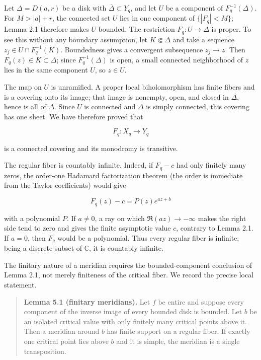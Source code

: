 Let \(\Delta=D(a,r)\) be a disk with \(\overline\Delta\subset Y_q\), and
let \(U\) be a component of \(F_q^{-1}(\Delta)\). For
\(M>|a|+r\), the connected set \(U\) lies in one component of
\(\{|F_q|<M\}\); Lemma 2.1 therefore makes \(U\) bounded. The restriction
\(F_q:U\to\Delta\) is proper. To see this without any boundary
assumption, let \(K\Subset\Delta\) and take a sequence
\(z_j\in U\cap F_q^{-1}(K)\). Boundedness gives a convergent subsequence
\(z_j\to z\). Then \(F_q(z)\in K\subset\Delta\); since
\(F_q^{-1}(\Delta)\) is open, a small connected neighborhood of \(z\) lies
in the same component \(U\), so \(z\in U\).

The map on \(U\) is unramified. A proper local biholomorphism has finite
fibers and is a covering onto its image; that image is nonempty, open, and
closed in \(\Delta\), hence is all of \(\Delta\). Since \(U\) is connected
and \(\Delta\) is simply connected, this covering has one sheet. We have
therefore proved that

\[
 F_q:X_q\longrightarrow Y_q
\]

is a connected covering and its monodromy is transitive.

The regular fiber is countably infinite. Indeed, if \(F_q-c\) had only
finitely many zeros, the order-one Hadamard factorization theorem (the order
is immediate from the Taylor coefficients) would give

\[
 F_q(z)-c=P(z)e^{az+b}
\]

with a polynomial \(P\). If \(a\ne0\), a ray on which
\(\Re(az)\to-\infty\) makes the right side tend to zero and gives the finite
asymptotic value \(c\), contrary to Lemma 2.1. If \(a=0\), then \(F_q\)
would be a polynomial. Thus every regular fiber is infinite; being a
discrete subset of \(\mathbb C\), it is countably infinite.

The finitary nature of a meridian requires the bounded-component conclusion
of Lemma 2.1, not merely finiteness of the critical fiber. We record the
precise local statement.

\begin{quote}
\textbf{Lemma 5.1 (finitary meridians).} Let \(f\) be entire and suppose every
component of the inverse image of every bounded disk is bounded. Let
\(b\) be an isolated critical value with only finitely many critical
points above it. Then a meridian around \(b\) has finite support on a
regular fiber. If exactly one critical point lies above \(b\) and it is
simple, the meridian is a single transposition.
\end{quote}

